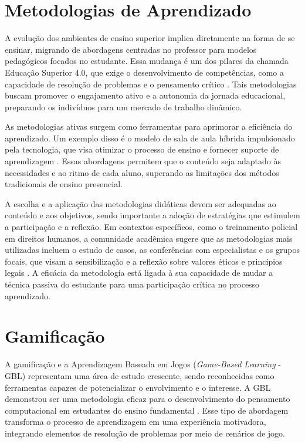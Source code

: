 \section{Metodologias de Aprendizado}

A evolução dos ambientes de ensino superior implica diretamente na forma de se ensinar, migrando de abordagens centradas no professor para modelos pedagógicos focados no estudante.
Essa mudança é um dos pilares da chamada Educação Superior 4.0, que exige o desenvolvimento de competências, como a capacidade de resolução de problemas e o pensamento crítico \cite{amghar_2025}.
Tais metodologias buscam promover o engajamento ativo e a autonomia da jornada educacional, preparando os indivíduos para um mercado de trabalho dinâmico.

As metodologias ativas surgem como ferramentas para aprimorar a eficiência do aprendizado.
Um exemplo disso é o modelo de sala de aula híbrida impulsionado pela tecnologia, que visa otimizar o processo de ensino e fornecer suporte de aprendizagem \cite{wang_2026}.
Essas abordagens permitem que o conteúdo seja adaptado às necessidades e ao ritmo de cada aluno, superando as limitações dos métodos tradicionais de ensino presencial.

A escolha e a aplicação das metodologias didáticas devem ser adequadas ao conteúdo e aos objetivos, sendo importante a adoção de estratégias que estimulem a participação e a reflexão.
Em contextos específicos, como o treinamento policial em direitos humanos, a comunidade acadêmica sugere que as metodologias mais utilizadas incluem o estudo de casos, as conferências com especialistas e os grupos focais, que visam a sensibilização e a reflexão sobre valores éticos e princípios legais \cite{salazar_2026}.
A eficácia da metodologia está ligada à sua capacidade de mudar a técnica passiva do estudante para uma participação crítica no processo aprendizado.

\section{Gamificação}
\label{sec:gamificacao}

A gamificação e a Aprendizagem Baseada em Jogos (\textit{Game-Based Learning} - GBL) representam uma área de estudo crescente, sendo reconhecidas como ferramentas capazes de potencializar o envolvimento e o interesse.
A GBL demonstrou ser uma metodologia eficaz para o desenvolvimento do pensamento computacional em estudantes do ensino fundamental \cite{hsu_2026}.
Esse tipo de abordagem transforma o processo de aprendizagem em uma experiência motivadora, integrando elementos de resolução de problemas por meio de cenários de jogo.

